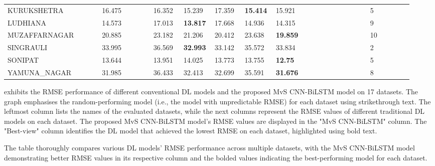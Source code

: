 \begin{landscape}
{\begin{longtable}[h!]{ p{0.22\linewidth} p{0.12\linewidth} p{0.07\linewidth} p{0.07\linewidth}  p{0.07\linewidth} p{0.07\linewidth} p{0.22\linewidth}  p{0.1\linewidth}}
     KURUKSHETRA    & 16.475          & 16.352    & 15.239          & 17.359     & \textbf{15.414}           & 15.921          & 5      \\
     LUDHIANA       & 14.573          & 17.013    & \textbf{13.817} & 17.668     & 14.936                    & 14.315          & 9      \\
     MUZAFFARNAGAR  & 20.885          & 23.182    & 21.206          & 20.412     & 23.638                   & \textbf{19.859} & 10     \\
     SINGRAULI      & 33.995          & 36.569    & \textbf{32.993} & 33.142     & 35.572                    & 33.834          & 2      \\
     SONIPAT        & 13.644          & 13.951    & 14.025          & 13.773     & 13.755                    & \textbf{12.75}  & 5      \\
     YAMUNA\_NAGAR  & 31.985          & 36.433    & 32.413          & 32.699     & 35.591                    & \textbf{31.676} & 8     \\ \hline
    \end{longtable}}
    \end{landscape}







   exhibits the RMSE performance of different conventional DL models and the proposed MvS CNN-BiLSTM model on 17 datasets. The graph emphasises the random-performing model (i.e.,  the model with unpredictable RMSE) for each dataset using strikethrough text. The leftmost column lists the names of the evaluated datasets,  while the next columns represent the RMSE values of different traditional DL models on each dataset. The proposed MvS CNN-BiLSTM model's RMSE values are displayed in the "MvS CNN-BiLSTM" column. The "Best-view" column identifies the DL model that achieved the lowest RMSE on each dataset,  highlighted using bold text.

  The table thoroughly compares various DL models' RMSE performance across multiple datasets,  with the MvS CNN-BiLSTM model demonstrating better RMSE values in its respective column and the bolded values indicating the best-performing model for each dataset.
  
